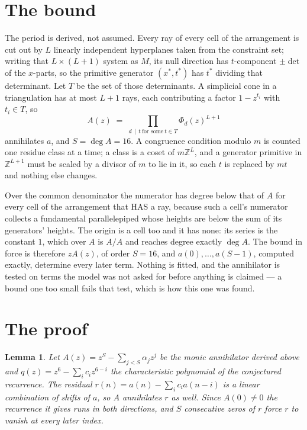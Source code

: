 \documentclass[11pt,a4paper]{article}
\theoremstyle{plain}
\newtheorem{lemma}[theorem]{Lemma}
\theoremstyle{definition}
\begin{document}
\section{The bound}

The period is derived, not assumed. Every ray of every cell of the arrangement is cut out by
$L$ linearly independent hyperplanes taken from the constraint set; writing that $L\times(L+1)$
system as $M$, its null direction has $t$-component $\pm\det$ of the $x$-parts, so the
primitive generator $(x^*,t^*)$ has $t^*$ dividing that determinant. Let $T$ be the set of
those determinants. A simplicial cone in a triangulation has at most $L+1$ rays, each
contributing a factor $1-z^{t_i}$ with $t_i\in T$, so
\[
A(z)\;=\;\prod_{d\,\mid\,t\ \text{for some}\ t\in T}\Phi_d(z)^{L+1}
\]
annihilates $a$, and $S=\deg A=16$. A congruence condition modulo $m$ is counted one residue
class at a time; a class is a coset of $m\mathbb{Z}^L$, and a generator primitive in
$\mathbb{Z}^{L+1}$ must be scaled by a divisor of $m$ to lie in it, so each $t$ is replaced
by $mt$ and nothing else changes.

Over the common denominator the numerator has degree below that of $A$ for every cell of the
arrangement that HAS a ray, because such a cell's numerator collects a fundamental
parallelepiped whose heights are below the sum of its generators' heights. The origin is a cell
too and it has none: its series is the constant $1$, which over $A$ is $A/A$ and reaches degree
exactly $\deg A$. The bound in force is therefore $zA(z)$, of order $S=16$, and
$a(0),\dots,a(S-1)$, computed exactly, determine every later term. Nothing is fitted, and the
annihilator is tested on terms the model was not asked for before anything is claimed --- a
bound one too small fails that test, which is how this one was found.

\section{The proof}

\begin{lemma}\label{lem:crit}
Let $A(z)=z^S-\sum_{j<S}\alpha_jz^{j}$ be the monic annihilator derived above and
$q(z)=z^{6}-\sum_ic_iz^{6-i}$ the characteristic polynomial of the conjectured
recurrence. The residual $r(n)=a(n)-\sum_ic_ia(n-i)$ is a linear combination of shifts of $a$,
so $A$ annihilates $r$ as well. Since $A(0)\ne0$ the recurrence it gives runs in both
directions, and $S$ consecutive zeros of $r$ force $r$ to vanish at every later index.
\end{lemma}
\end{document}
